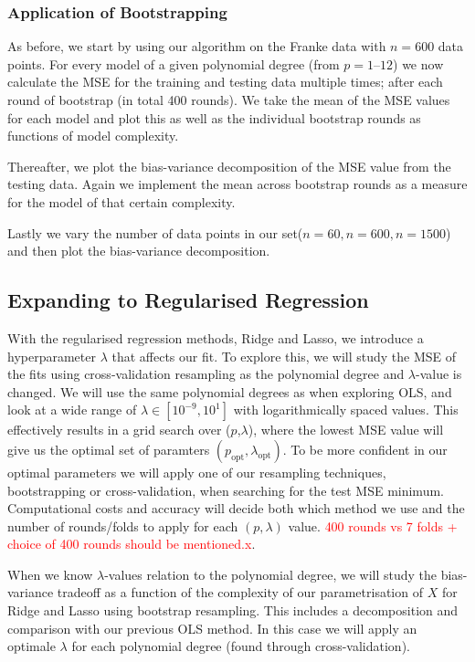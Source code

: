 \documentclass[twocolumn,english,notitlepage]{article}
\newcommand{\comment}[1]{\textcolor{red}{#1}}
\newcommand{\msub}[2]{\ensuremath{{#1}_\text{#2}}}
\begin{document}
        \subsubsection{Application of Bootstrapping}
            As before, we start by using our algorithm on the Franke data with $n=600$ data points. For every model of a given polynomial degree (from $p=1\text{--}12$) we now calculate the MSE for the training and testing data multiple times; after each round of bootstrap (in total 400 rounds). We take the mean of the MSE values for each model and plot this as well as the individual bootstrap rounds as functions of model complexity. 
        
            Thereafter, we plot the bias-variance decomposition of the MSE value from the testing data. Again we implement the mean across bootstrap rounds as a measure for the model of that certain complexity.
        
            Lastly we vary the number of data points in our set($n=60, n=600, n=1500$) and then plot the bias-variance decomposition. 



    
    \subsection{Expanding to Regularised Regression}
        With the regularised regression methods, Ridge and Lasso, we introduce a hyperparameter $\lambda$ that affects our fit. To explore this, we will study the MSE of the fits using cross-validation resampling as the polynomial degree and $\lambda$-value is changed. We will use the same polynomial degrees as when exploring OLS, and look at a wide range of $\lambda \in [10^{-9}, 10^1]$ with logarithmically spaced values. This effectively results in a grid search over ($p$,$\lambda$), where the lowest MSE value will give us the optimal set of paramters $(\msub{p}{opt}, \msub{\lambda}{opt})$. To be more confident in our optimal parameters we will apply one of our resampling techniques, bootstrapping or cross-validation, when searching for the test MSE minimum. Computational costs and accuracy will decide both which method we use and the number of rounds/folds to apply for each $(p,\lambda)$ value. \comment{400 rounds vs 7 folds + choice of 400 rounds should be mentioned.x}.     

        When we know $\lambda$-values relation to the polynomial degree, we will study the bias-variance tradeoff as a function of the complexity of our parametrisation of $X$ for Ridge and Lasso using bootstrap resampling. This includes a decomposition and comparison with our previous OLS method. In this case we will apply an optimale $\lambda$ for each polynomial degree (found through cross-validation).
        
\end{document}
